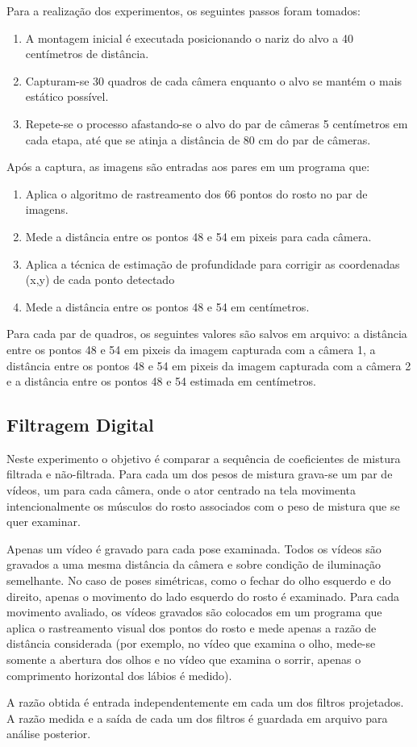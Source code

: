 Para a realização dos experimentos, os seguintes passos foram tomados:

\begin{enumerate}
\item A montagem inicial é executada posicionando o nariz do alvo a 40 centímetros de distância.
\item Capturam-se 30 quadros de cada câmera enquanto o alvo se mantém o mais estático possível.
\item Repete-se o processo afastando-se o alvo do par de câmeras 5 centímetros em cada etapa, até que se atinja a distância de 80 cm do par de câmeras.
\end{enumerate}

Após a captura, as imagens são entradas aos pares em um programa que:

\begin{enumerate}
\item Aplica o algoritmo de rastreamento dos 66 pontos do rosto no par de imagens.
\item Mede a distância entre os pontos 48 e 54 em pixeis para cada câmera.
\item Aplica a técnica de estimação de profundidade para corrigir as coordenadas (x,y) de cada ponto detectado
\item Mede a distância entre os pontos 48 e 54 em centímetros.
\end{enumerate}

Para cada par de quadros, os seguintes valores são salvos em arquivo: a distância entre os pontos 48 e 54 em pixeis da imagem capturada com a câmera 1, a distância entre os pontos 48 e 54 em pixeis da imagem capturada com a câmera 2 e a distância entre os pontos 48 e 54 estimada em centímetros. 


\subsection{Filtragem Digital}

Neste experimento o objetivo é comparar a sequência de coeficientes de mistura filtrada e não-filtrada.
Para cada um dos pesos de mistura grava-se um par de vídeos, um para cada câmera, onde o ator centrado na tela movimenta intencionalmente os músculos do rosto associados com o peso de mistura que se quer examinar. 

Apenas um vídeo é gravado para cada pose examinada. Todos os vídeos são gravados a uma mesma distância da câmera e sobre condição de iluminação semelhante. No caso de poses simétricas, como o fechar do olho esquerdo e do direito, apenas o movimento do lado esquerdo do rosto é examinado. Para cada movimento avaliado, os vídeos gravados são colocados em um programa que aplica o rastreamento visual dos pontos do rosto e mede apenas a razão de distância considerada (por exemplo, no vídeo que examina o olho, mede-se somente a abertura dos olhos e no vídeo que examina o sorrir, apenas o comprimento horizontal dos lábios é medido). 

A razão obtida é entrada independentemente em cada um dos filtros projetados. A razão medida e a saída de cada um dos filtros é guardada em arquivo para análise posterior.

